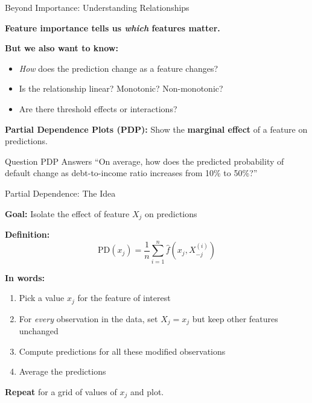\documentclass[10pt]{beamer}
\newcommand{\highlight}[1]{\textcolor{AccentOrange}{\textbf{#1}}}
\begin{document}
\begin{frame}{Beyond Importance: Understanding Relationships}

  \highlight{Feature importance tells us \emph{which} features matter.}

  \vspace{0.5em}
  \textbf{But we also want to know:}
  \begin{itemize}
    \item \emph{How} does the prediction change as a feature changes?
    \item Is the relationship linear? Monotonic? Non-monotonic?
    \item Are there threshold effects or interactions?
  \end{itemize}

  \vspace{1em}
  \textbf{Partial Dependence Plots (PDP):} Show the \highlight{marginal effect} of a feature on predictions.

  \vspace{0.5em}
  \begin{block}{Question PDP Answers}
    ``On average, how does the predicted probability of default change as debt-to-income ratio increases from 10\% to 50\%?''
  \end{block}
\end{frame}


\begin{frame}{Partial Dependence: The Idea}

  \textbf{Goal:} Isolate the effect of feature $X_j$ on predictions

  \vspace{1em}
  \textbf{Definition:}
  \[
  \text{PD}(x_j) = \frac{1}{n} \sum_{i=1}^{n} \widehat{f}(x_j, X_{-j}^{(i)})
  \]

  \vspace{0.5em}
  \textbf{In words:}
  \begin{enumerate}
    \item Pick a value $x_j$ for the feature of interest
    \item For \emph{every} observation in the data, set $X_j = x_j$ but keep other features unchanged
    \item Compute predictions for all these modified observations
    \item Average the predictions
  \end{enumerate}

  \vspace{0.5em}
  \textbf{Repeat} for a grid of values of $x_j$ and plot.
\end{frame}
\end{document}
